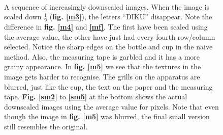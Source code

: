 \documentclass[a4paper, 10pt, final]{article}
\begin{document}
\begin{figure}[!h]
    \\
    \hspace{1em}
    \hspace{1em}
    \hspace{1em}
    \caption[]{A sequence of increasingly downscaled images. When the
    image is scaled down $\frac{1}{9}$ (\textbf{fig. \ref{m3}}), the
    letters ``DIKU'' disappear. Note the difference in \textbf{fig.
    \ref{m4}} and \textbf{\ref{mf}}. The first have been scaled using
    the average value, the other have just had every fourth row/column
    selected.  Notice the sharp edges on the bottle and cup in the naive
    method.  Also, the measuring tape is garbled and it has a more
    grainy appearance. In \textbf{fig. \ref{m5}} we see that the
    textures in the image gets harder to recognise. The grills on the
    apparatus are blurred, just like the cup, the text on the paper and
    the measuring tape. \textbf{Fig.  \ref{sm2}} to \textbf{\ref{sm5}}
    at the bottom shows the actual downscaled images using the average
    value for pixels.  Note that even though the image in \textbf{fig.
    \ref{m5}} was blurred, the final small version still resembles the
    original.}
    \label{sequence_scale}
\end{figure}




\end{document}

